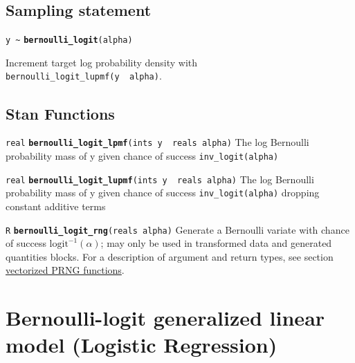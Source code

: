 \documentclass[
  10pt,
]{book}
\begin{document}
\hypertarget{sampling-statement-1}{%
\subsection{Sampling statement}\label{sampling-statement-1}}

\texttt{y\ \textasciitilde{}} \textbf{\texttt{bernoulli\_logit}}\texttt{(alpha)}

Increment target log probability density with \texttt{bernoulli\_logit\_lupmf(y\ \textbar{}\ alpha)}.

\hypertarget{stan-functions-1}{%
\subsection{Stan Functions}\label{stan-functions-1}}


\texttt{real} \textbf{\texttt{bernoulli\_logit\_lpmf}}\texttt{(ints\ y\ \textbar{}\ reals\ alpha)}\newline
The log Bernoulli probability mass of y given chance of success
\texttt{inv\_logit(alpha)}


\texttt{real} \textbf{\texttt{bernoulli\_logit\_lupmf}}\texttt{(ints\ y\ \textbar{}\ reals\ alpha)}\newline
The log Bernoulli probability mass of y given chance of success
\texttt{inv\_logit(alpha)} dropping constant additive terms


\texttt{R} \textbf{\texttt{bernoulli\_logit\_rng}}\texttt{(reals\ alpha)}\newline
Generate a Bernoulli variate with chance of success
\(\text{logit}^{-1}(\alpha)\); may only be used in transformed data and generated
quantities blocks. For a description of argument and return types, see section
\protect\hyperlink{prng-vectorization}{vectorized PRNG functions}.

\hypertarget{bernoulli-logit-glm}{%
\section{Bernoulli-logit generalized linear model (Logistic Regression)}\label{bernoulli-logit-glm}}
\end{document}
